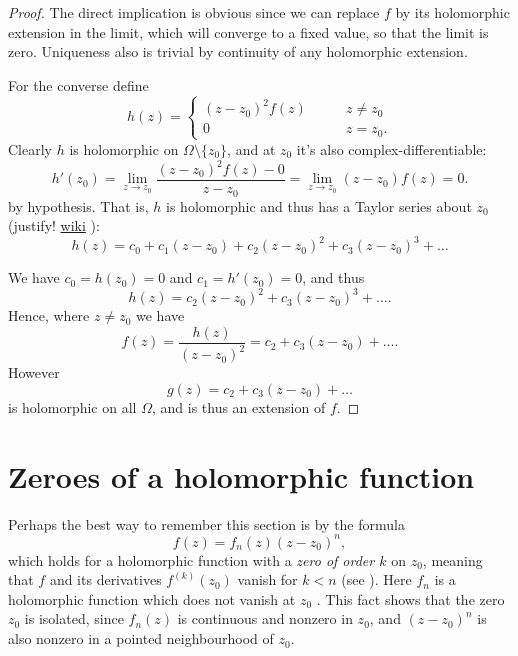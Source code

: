 \begin{proof}
The direct implication is obvious since we
can replace $f$ by
its holomorphic extension in the limit, which
will converge to a fixed
value, so that the limit is zero. Uniqueness
also is trivial
by continuity of any holomorphic extension.

For the converse define
$$
h(z)=\begin{cases}
(z-z_0)^2f(z)\qquad &z \neq z_0 \\
0\qquad &z=z_0.
\end{cases}
$$
Clearly $h$ is holomorphic on
$\Omega\setminus\{z_0\}$,
and at $z_0$ it's also
complex-differentiable:
$$
h'(z_0)=\lim_{z \to z_0}
\frac{(z-z_0)^2f(z)-0}{z-z_0}
=\lim_{z\to z_0}(z-z_0)f(z)=0.
$$
by hypothesis. That is, $h$ is holomorphic
and thus has a Taylor series about $z_0$
(justify!
\href{https://en.wikipedia.org/wiki/%
Analyticity_of_holomorphic_functions}{wiki}
):
$$
h(z)=c_0+c_1(z-z_0)+c_2(z-z_0)^2+c_3(z-z_0)
^3+\ldots
$$

We have $c_0=h(z_0)=0$ and $c_1=h'(z_0)=0$,
and thus
$$
h(z)=c_2(z-z_0)^2+c_3(z-z_0)^3+\ldots.
$$
Hence, where $z\neq z_0$ we have
$$
f(z)=\frac{h(z)}{(z-z_0)^2}=c_2+c_3(z-z_0)+
\ldots.
$$
However
$$
g(z)=c_2+c_3(z-z_0)+\ldots
$$
is holomorphic on all $\Omega$, and is thus
an extension of $f$.
\end{proof}

\section{Zeroes of a holomorphic function}
\label{section-zeroes}

\noindent
Perhaps the best way to remember this section
is by the formula
\begin{equation}
\label{equation-zero}
f(z)=f_n(z)(z-z_0)^n,
\end{equation}
which holds for a holomorphic function with a
{\it zero of order $k$} on
$z_0$, meaning that $f$ and its derivatives
$f^{(k)}(z_0)$ vanish
for $k<n$ (see \cite[p. 126]{Ahlfors}).
Here $f_n$ is a holomorphic function which
does not vanish at $z_0$ .
This fact shows that the zero $z_0$ is
isolated,
since $f_n(z)$ is continuous and nonzero in
$z_0$,
and $(z-z_0)^n$ is also nonzero in a pointed
neighbourhood of $z_0$.

